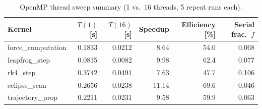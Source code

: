 \begin{table}[htbp]
\centering
\caption{OpenMP thread sweep summary (1 vs.\ 16 threads, 5 repeat runs each).}
\label{tab:benchmark}
\begin{tabular}{lrrrrr}
\toprule
Kernel & $T(1)$ [s] & $T(16)$ [s] & Speedup & Efficiency [\%] & Serial frac.\ $f$ \\
\midrule
force\_computation & 0.1833 & 0.0212 & 8.64 & 54.0 & 0.068 \\
leapfrog\_step & 0.0815 & 0.0082 & 9.98 & 62.4 & 0.077 \\
rk4\_step & 0.3742 & 0.0491 & 7.63 & 47.7 & 0.106 \\
eclipse\_scan & 0.2656 & 0.0238 & 11.14 & 69.6 & 0.046 \\
trajectory\_prop & 0.2211 & 0.0231 & 9.58 & 59.9 & 0.063 \\
\bottomrule
\end{tabular}
\end{table}